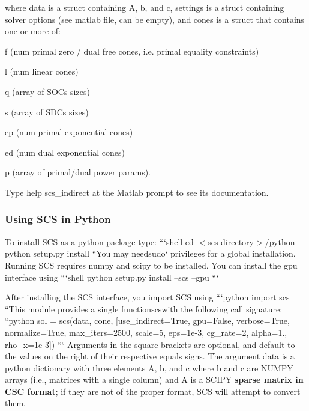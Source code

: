 where data is a struct containing {\ttfamily A}, {\ttfamily b}, and {\ttfamily c}, settings is a struct containing solver options (see matlab file, can be empty), and cones is a struct that contains one or more of\-:
\begin{DoxyItemize}
\item {\ttfamily f} (num primal zero / dual free cones, i.\-e. primal equality constraints)
\item {\ttfamily l} (num linear cones)
\item {\ttfamily q} (array of S\-O\-Cs sizes)
\item {\ttfamily s} (array of S\-D\-Cs sizes)
\item {\ttfamily ep} (num primal exponential cones)
\item {\ttfamily ed} (num dual exponential cones)
\item {\ttfamily p} (array of primal/dual power params).
\end{DoxyItemize}

Type {\ttfamily help scs\-\_\-indirect} at the Matlab prompt to see its documentation.

\subsubsection*{Using S\-C\-S in Python}

To install S\-C\-S as a python package type\-: ```shell cd $<$scs-\/directory$>$/python python setup.\-py install ``{\ttfamily  You may need}sudo` privileges for a global installation. Running S\-C\-S requires numpy and scipy to be installed. You can install the gpu interface using ```shell python setup.\-py install --scs --gpu ```

After installing the S\-C\-S interface, you import S\-C\-S using ```python import scs ``{\ttfamily  This module provides a single function}scs{\ttfamily with the following call signature\-: }``python sol = scs(data, cone, \mbox{[}use\-\_\-indirect=True, gpu=False, verbose=True, normalize=True, max\-\_\-iters=2500, scale=5, eps=1e-\/3, cg\-\_\-rate=2, alpha=1., rho\-\_\-x=1e-\/3\mbox{]}) ``` Arguments in the square brackets are optional, and default to the values on the right of their respective equals signs. The argument {\ttfamily data} is a python dictionary with three elements {\ttfamily A}, {\ttfamily b}, and {\ttfamily c} where {\ttfamily b} and {\ttfamily c} are N\-U\-M\-P\-Y arrays (i.\-e., matrices with a single column) and {\ttfamily A} is a S\-C\-I\-P\-Y {\bfseries sparse matrix in C\-S\-C format}; if they are not of the proper format, S\-C\-S will attempt to convert them.

